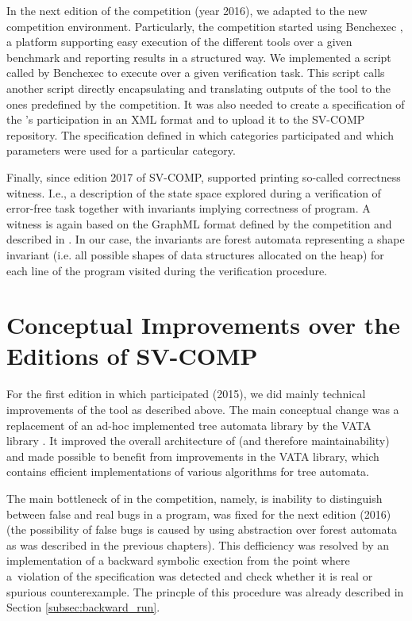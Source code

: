 {In the next edition of the competition (year 2016), we adapted \forester to the new competition environment.
Particularly, the competition started using Benchexec \cite{sttt-benchexec}, a platform
supporting easy execution of the different tools over a given benchmark and reporting results in a structured way.
We implemented a script called by Benchexec to execute \forester over a given 
verification task.
This script calls another script directly encapsulating \forester and translating outputs of the tool to the ones
predefined by the competition.
It was also needed to create a specification of the \forester's participation in an XML format and to upload it to the SV-COMP repository.
The specification defined in which categories \forester participated and which parameters were used
for a particular category.

Finally, since edition 2017 of SV-COMP, \forester supported printing so-called correctness witness.
I.e., a description of the state space explored during a verification of error-free task together with
invariants implying correctness of program.
A witness is again based on the GraphML format defined by the competition and described in \cite{fse16-correct}.
In our case, the invariants are forest automata representing a shape invariant (i.e. all possible shapes of data structures
allocated on the heap) for each line of the program visited during the verification procedure.

\section{Conceptual Improvements over the Editions of SV-COMP}
For the first edition in which \forester participated (2015), we did mainly technical improvements of the tool as described above.
The main conceptual change was a replacement of an ad-hoc implemented tree automata library by the VATA library \cite{libvata}.
It improved the overall architecture of \forester (and therefore maintainability) and made possible
to benefit from improvements in the VATA library, which contains efficient implementations of
various algorithms for tree automata.

The main bottleneck of \forester in the competition, namely, is inability to distinguish between false and real bugs in a program,
was fixed for the next edition (2016) (the possibility of false bugs is caused by using abstraction over forest
automata as was described in the previous chapters).
This defficiency was resolved by an implementation of a backward symbolic exection from the point where a~violation of the specification was detected
and check whether it is real or spurious counterexample.
The princple of this procedure was already described in Section \ref{subsec:backward_run}.

}
